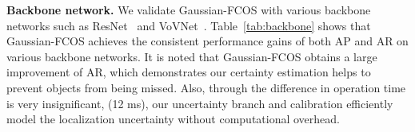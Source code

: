 \documentclass[final]{cvpr}
\begin{document}
\medskip

\noindent
\textbf{Backbone network.}
We validate Gaussian-FCOS with various backbone networks such as ResNet~\cite{he2016deep} and VoVNet~\cite{lee2019centermask}.
Table~\ref{tab:backbone} shows that Gaussian-FCOS achieves the consistent performance gains of both AP and AR on various backbone networks.
It is noted that Gaussian-FCOS obtains a large improvement of AR, which demonstrates our certainty estimation helps to prevent objects from being missed. 
Also, through the difference in operation time is very insignificant, (12 ms), our uncertainty branch and calibration efficiently model the localization uncertainty without computational overhead. 


\begin{table}[t]
\centering
{}
\caption{\textbf{Comparison of different backbones on Gaussian-FCOS.} }
\label{tab:backbone}
\vspace{-0.5cm}

\end{table}
\end{document}
